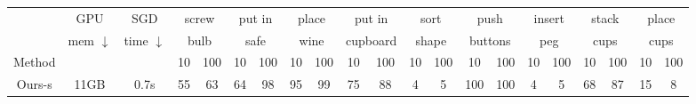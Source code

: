 \begin{table*}[!ht]
\begin{tabular}{ccccccccccccccccccccc}
\bottomrule \rule{0pt}{4ex} 
       & GPU & SGD & \multicolumn{2}{c}{screw} & \multicolumn{2}{c}{put in} & \multicolumn{2}{c}{place}    & \multicolumn{2}{c}{put in}   & \multicolumn{2}{c}{sort}  & \multicolumn{2}{c}{push}    & \multicolumn{2}{c}{insert} & \multicolumn{2}{c}{stack} & \multicolumn{2}{c}{place}  \\
       & mem $\downarrow$ & time $\downarrow$ & \multicolumn{2}{c}{bulb}   & \multicolumn{2}{c}{safe}   & \multicolumn{2}{c}{wine}     & \multicolumn{2}{c}{cupboard} & \multicolumn{2}{c}{shape} & \multicolumn{2}{c}{buttons} & \multicolumn{2}{c}{peg}    & \multicolumn{2}{c}{cups}  & \multicolumn{2}{c}{cups}   \\ \rule{0pt}{3ex} 
Method  &  &      & 10           & 100          & 10           & 100         & 10           & 100           & 10           & 100           & 10          & 100         & 10           & 100          & 10           & 100         & 10          & 100         & 10           & 100         \\ \midrule
Ours-s  & 11GB & 0.7s  & 55        & 63           & 64           & 98          & 95           & 99            & 75           & 88            & 4           & 5           & 100          & 100          & 4            & 5           & 68          & 87          & 15           & 8           \\

\end{tabular}
\end{table*}
